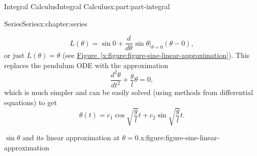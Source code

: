 \documentclass[twoside,10pt,]{book}
\newcommand{\xreffont}{\relax}
\numberwithin{equation}{part}
\newcommand{\dv}[3][]{\dfrac{d^{#1} #2}{d #3^{#1}}}
\begin{document}
\begin{partptx}{Integral Calculus}{}{Integral Calculus}{}{}{x:part:part-integral}
\begin{chapterptx}{Series}{}{Series}{}{}{x:chapter:series}
\begin{introduction}{}
\begin{equation*}
L(\theta) = \sin0 + \dv{}{\theta}\sin\theta\Big|_{\theta= 0}(\theta - 0),
\end{equation*}
or just \(L(\theta) = \theta\) (see \hyperref[x:figure:figure-sine-linear-approximation]{Figure~{\xreffont\ref{x:figure:figure-sine-linear-approximation}}}). This replaces the pendulum ODE with the approximation%
\begin{equation*}
\dv[2]{\theta}{t} + \frac{g}{l}\theta = 0,
\end{equation*}
which is much simpler and can be easily solved (using methods from differential equations) to get%
\begin{equation*}
\theta(t) = c_{1}\cos\sqrt{\frac{g}{l}}t + c_{2}\sin\sqrt{\frac{g}{l}}t.
\end{equation*}
%
\begin{figureptx}{\(\sin\theta\) and its linear approximation at \(\theta=0\).}{x:figure:figure-sine-linear-approximation}{}%
\begin{image}{0}{1}{0}%
\end{image}
\end{figureptx}
\end{introduction}
\end{chapterptx}
\end{partptx}
\end{document}
